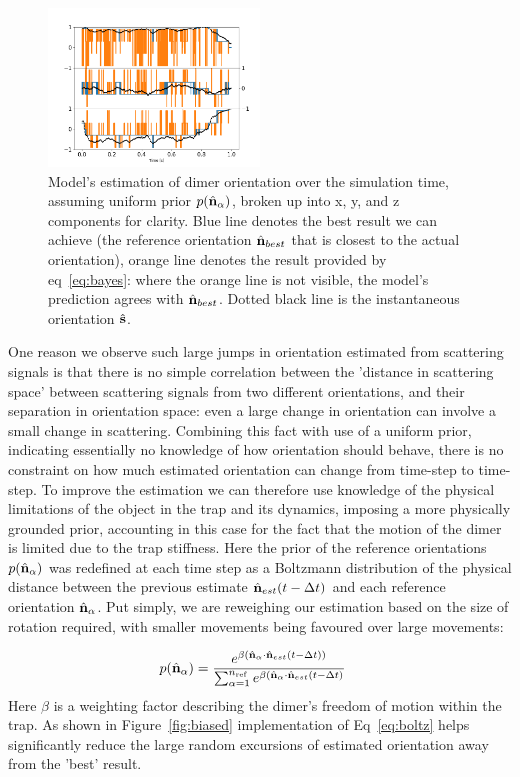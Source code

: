 \documentclass[12pt]{spieman}
\begin{document}
\begin{spacing}{1.5}
\begin{figure}[h]
	\centering
	\includegraphics[width=0.5\textwidth]{./Images/fig5.png}
	\caption{Model's estimation of dimer orientation over the simulation time, assuming uniform prior $p(\hat{\bf n}_\alpha)$, broken up into x, y, and z components for clarity. Blue line denotes the best result we can achieve (the reference orientation $\hat{\bf n}_{best}$ that is closest to the actual orientation), orange line denotes the result provided by eq~\ref{eq:bayes}: where the orange line is not visible, the model's prediction agrees with $\hat{\bf n}_{best}$. Dotted black line is the instantaneous orientation $\hat{\bf s}$.}
	\label{fig:uniform}
\end{figure} 

One reason we observe such large jumps in orientation estimated from scattering signals is that there is no simple correlation between the 'distance in scattering space' between scattering signals from two different orientations, and their separation in orientation space: even a large change in orientation can involve a small change in scattering. Combining this fact with use of a uniform prior, indicating essentially no knowledge of how orientation should behave, there is no constraint on how much estimated orientation can change from time-step to time-step. To improve the estimation we can therefore use knowledge of the physical limitations of the object in the trap and its dynamics, imposing a more physically grounded prior, accounting in this case for the fact that the motion of the dimer is limited due to the trap stiffness. Here the prior of the reference orientations $p(\hat{\bf n}_\alpha)$ was redefined at each time step as a Boltzmann distribution of the physical distance between the previous estimate $\hat{\bf n}_{est}(t-\Delta t)$ and each reference orientation $\hat{\bf n}_\alpha$. Put simply, we are reweighing our estimation based on the size of rotation required, with smaller movements being favoured over large movements:

\begin{align}
  p(\hat{\bf n}_\alpha)
  &=\frac{e^{\beta (\hat{\bf n}_\alpha 
  	\cdot \hat{\bf n}_{est}(t-\Delta t))}}
  {\sum_{\alpha=1}^{n_{\rm ref}}
	e^{\beta (\hat{\bf n}_\alpha 
	\cdot \hat{\bf n}_{est}(t-\Delta t)}}
	\label{eq:boltz}
\end{align}
Here $\beta$ is a weighting factor describing the dimer's freedom of motion within the trap. As shown in Figure~\ref{fig:biased} implementation of Eq~\eqref{eq:boltz} helps significantly reduce the large random excursions of estimated orientation away from the 'best' result. 


\end{spacing}
\end{document}
